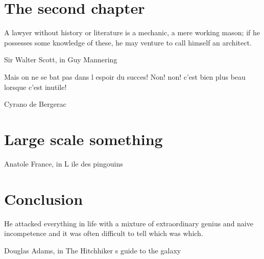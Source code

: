 \documentclass{ucbthesis}
\begin{document}
\chapter{The second chapter}
\epigraph{A lawyer without history or literature is a mechanic, a mere working mason;
if he possesses some knowledge of these, he may venture to call himself an architect.}{Sir Walter Scott, in Guy Mannering}




\epigraph{Mais on ne se bat pas dans l espoir du succes! Non! non! c'est bien plus beau lorsque c'est inutile!}{Cyrano de Bergerac}




% 

\chapter{Large scale something}
\epigraph{
}{Anatole France, in L ile des pingouins}







\chapter{Conclusion}
\epigraph{He attacked everything in life with a mixture of extraordinary genius and naive incompetence
and it was often difficult to tell which was which.}{Douglas Adams, in The Hitchhiker s guide to the galaxy}

\printbibliography
\end{document}
